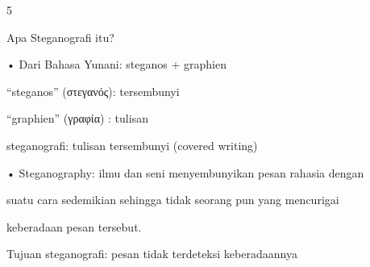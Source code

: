 \documentclass{article}
\begin{document}

5

Apa Steganografi itu?

• Dari Bahasa Yunani: steganos + graphien


“steganos”  (στεγανός):  tersembunyi


“graphien”  (γραφία)    : tulisan

 steganografi:  tulisan tersembunyi (covered writing)

• Steganography: ilmu dan seni menyembunyikan pesan rahasia dengan 

suatu cara sedemikian sehingga tidak seorang pun yang mencurigai 

keberadaan pesan tersebut.

   Tujuan steganografi: pesan tidak terdeteksi  keberadaannya
\end{document}
